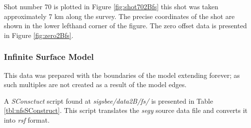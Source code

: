 Shot number 70 is plotted in Figure \ref{fig:shot702Bfs} this shot was taken approximately 7 km along the survey.  The precise coordinates
of the shot are shown in the lower lefthand corner of the figure.  The zero offset data is presented in Figure \ref{fig:zero2Bfs}.     


\subsubsection{Infinite Surface Model}
This data was prepared with the boundaries of the model extending forever; as such multiples are not created as a  result of the model edges.  

A \emph{SConsctuct} script found at \textit{sigsbee/data2B/fs/} is presented in Table \ref{tbl:nfsSConstruct}.  This script 
translates the \emph{segy} source data file and converts it into \emph{rsf} format.  

{
\tiny

\normalsize
}


